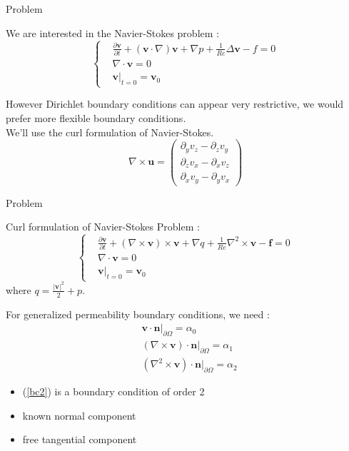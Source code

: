 \documentclass{beamer}
\newcommand{\grad}{{\nabla}}
\newcommand{\laplace}{{\Delta}}
\newcommand{\curl}{{\nabla\times}}
\newcommand{\curll}{{\nabla^2\times}}
\renewcommand{\div}{{\nabla\cdot}}
\newcommand{\restr}{{\big\rvert_{\partial\Omega}}}
\begin{document}
\begin{frame}{Problem}
  \begin{block}{We are interested in the Navier-Stokes problem :}
    \[ \left\{
    \begin{aligned}
      &\frac{\partial\mathbf{v}}{\partial t} + (\mathbf{v}\cdot\grad)\mathbf{v} + \grad p + \frac{1}{Re}\laplace\mathbf{v} -f = 0\\
      &\div\mathbf{v} = 0\\
      &\mathbf{v}\big\rvert_{t=0} = \mathbf{v}_0
    \end{aligned}
    \right.\]
  \end{block}
  However Dirichlet boundary conditions can appear very restrictive, we would prefer more flexible boundary conditions.\\
  We'll use the curl formulation of Navier-Stokes.\\
  \[ \curl\mathbf{u} = \begin{pmatrix}
    \partial_y v_z - \partial_z v_y\\
    \partial_z v_x - \partial_x v_z\\
    \partial_x v_y - \partial_y v_x
  \end{pmatrix} \]
\end{frame}

\begin{frame}{Problem}
  \begin{block}{Curl formulation of Navier-Stokes Problem :}
    \begin{equation}
      \label{start}
      \left\{\begin{aligned}
      &\frac{\partial \mathbf{v}}{\partial t} + (\curl  \mathbf{v})\times \mathbf{v} + \grad q + \frac{1}{Re}\curll  \mathbf{v}-\mathbf{f} = 0\\
      &\div \mathbf{v} = 0\\
      &\mathbf{v}\big\rvert_{t=0} = \mathbf{v}_0
      \end{aligned}\right.
    \end{equation}
    where $q = \frac{|\mathbf{v}|^2}{2}+p$.
  \end{block}
  For generalized permeability boundary conditions, we need :
  \begin{align}
    &\mathbf{v}\cdot \mathbf{n}\restr = \alpha_0 \label{bc0}\\
    &(\curl  \mathbf{v})\cdot \mathbf{n}\restr = \alpha_1 \label{bc1}\\
    &(\curll  \mathbf{v})\cdot \mathbf{n}\restr = \alpha_2 \label{bc2}
  \end{align}
  \begin{itemize}
  \item (\ref{bc2}) is a boundary condition of order 2
  \item known normal component
  \item free tangential component
  \end{itemize}
\end{frame}
\end{document}
